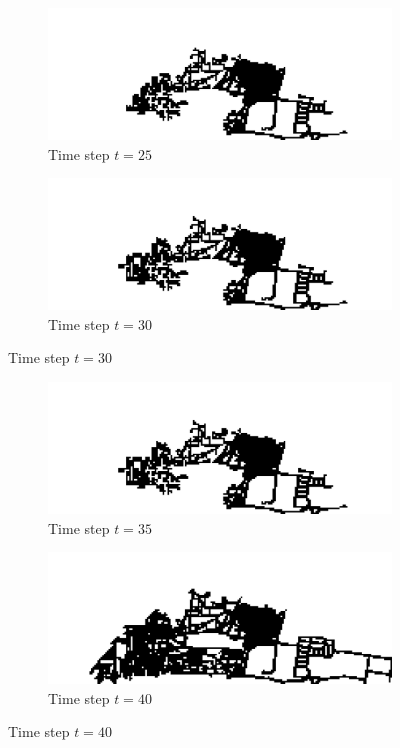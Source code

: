 \begin{figure}[H]
\begin{subfigure}{.5\textwidth}
  \centering
  \includegraphics[width=1\linewidth]{Figures/Chapter4/generation-25-melusi}
  \caption*{Time step $t = 25$}
\end{subfigure}
\begin{subfigure}{.5\textwidth}
  \centering
  \includegraphics[width=1\linewidth]{Figures/Chapter4/generation-30-melusi}
  \caption*{Time step $t = 30$}
\end{subfigure}
\end{figure}

\begin{figure}[H]
\begin{subfigure}{.5\textwidth}
  \centering
  \includegraphics[width=1\linewidth]{Figures/Chapter4/generation-35-melusi}
  \caption*{Time step $t = 35$}
\end{subfigure}
\begin{subfigure}{.5\textwidth}
  \centering
  \includegraphics[width=1\linewidth]{Figures/Chapter4/generation-40-melusi}
  \caption*{Time step $t = 40$}
\end{subfigure}
\end{figure}

